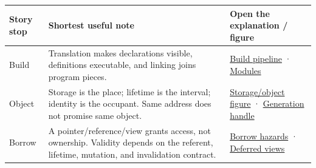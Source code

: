 {\def\LTcaptype{none} %
\begin{longtable}[]{@{}
  >{\raggedright\arraybackslash}p{}
  >{\raggedright\arraybackslash}p{}
  >{\raggedright\arraybackslash}p{}@{}}
\toprule\noalign{}
\begin{minipage}[b]{\linewidth}\raggedright
Story stop
\end{minipage} & \begin{minipage}[b]{\linewidth}\raggedright
Shortest useful note
\end{minipage} & \begin{minipage}[b]{\linewidth}\raggedright
Open the explanation / figure
\end{minipage} \\
\midrule\noalign{}
\endhead
\bottomrule\noalign{}
\endlastfoot
Build & Translation makes declarations visible, definitions executable, and linking joins program pieces. & \href{Continuous\%20Notes/Computing\%20Foundations\%20-\%20From\%20Bits\%20to\%20C++\%20and\%20Systems\%20APIs\#The\%20journey\%20from\%20text\%20to\%20a\%20live\%20object/}{Build pipeline} · \href{Continuous\%20Notes/Computing\%20Foundations\%20-\%20From\%20Bits\%20to\%20C++\%20and\%20Systems\%20APIs\#A\%20compiled\%20interface\%20rather\%20than\%20repeated\%20text/}{Modules} \\
Object & Storage is the place; lifetime is the interval; identity is the occupant. Same address does not promise same object. & \href{Continuous\%20Notes/Computing\%20Foundations\%20-\%20From\%20Bits\%20to\%20C++\%20and\%20Systems\%20APIs\#Storage\%20is\%20a\%20place;\%20an\%20object\%20is\%20its\%20occupant/}{Storage/object figure} · \href{Continuous\%20Notes/Computing\%20Foundations\%20-\%20From\%20Bits\%20to\%20C++\%20and\%20Systems\%20APIs\#A\%20handle\%20remembers\%20which\%20occupant\%20was\%20intended/}{Generation handle} \\
Borrow & A pointer/reference/view grants access, not ownership. Validity depends on the referent, lifetime, mutation, and invalidation contract. & \href{Continuous\%20Notes/Computing\%20Foundations\%20-\%20From\%20Bits\%20to\%20C++\%20and\%20Systems\%20APIs\#When\%20a\%20valid\%20borrow\%20stops\%20naming\%20the\%20intended\%20thing/}{Borrow hazards} · \href{Continuous\%20Notes/Computing\%20Foundations\%20-\%20From\%20Bits\%20to\%20C++\%20and\%20Systems\%20APIs\#Borrowed\%20views\%20and\%20deferred\%20work\%20need\%20an\%20owner\%20story/}{Deferred views} \\

\end{longtable}}
